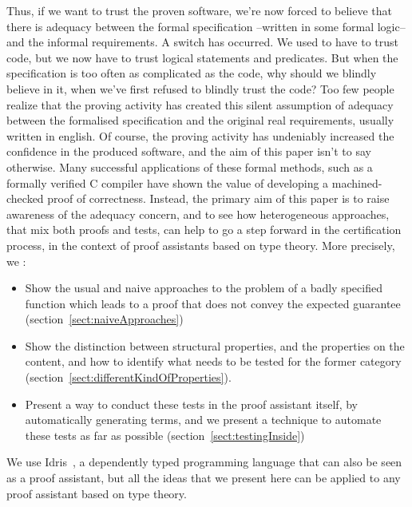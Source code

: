 Thus, if we want to trust the proven software, we're now forced to believe that there is adequacy between the formal specification --written in some formal logic-- and the informal requirements. A switch has occurred. We used to have to trust code, but we now have to trust logical statements and predicates. But when the specification is too often as complicated as the code, why should we blindly believe in it, when we've first refused to blindly trust the code? Too few people realize that the proving activity has created this silent assumption of adequacy between the formalised specification and the original real requirements, usually written in english. Of course, the proving activity has undeniably increased the confidence in the produced software, and the aim of this paper isn't to say otherwise. Many successful applications of these formal methods, such as a formally verified C compiler \cite{Leroy09} have shown the value of developing a machined-checked proof of correctness. Instead, the primary aim of this paper is to raise awareness of the adequacy concern, and to see how heterogeneous approaches, that mix both proofs and tests, can help to go a step forward in the certification process, in the context of proof assistants based on type theory.
More precisely, we :
\begin{itemize}
	\item Show the usual and naive approaches to the problem of a badly specified function which leads to a proof that does not convey the expected guarantee (section~\ref{sect:naiveApproaches})
	\item Show the distinction between structural properties, and the properties on the content, and how to identify what needs to be tested for the former category (section~\ref{sect:differentKindOfProperties}).
	\item Present a way to conduct these tests in the proof assistant itself, by automatically generating terms, and we present a technique to automate these tests as far as possible (section~\ref{sect:testingInside})
\end{itemize}

We use Idris~\cite{brady2013idris}, a dependently typed programming language that can also be seen as a proof assistant, but all the ideas that we present here can be applied to any proof assistant based on type theory.

